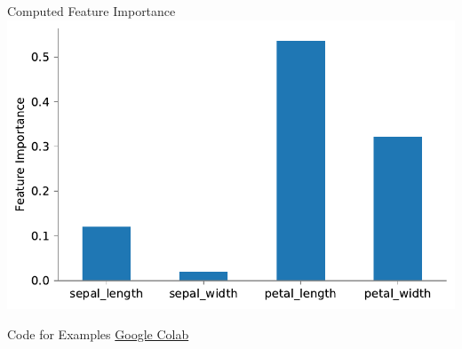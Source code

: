 \documentclass{beamer}
\begin{document}
\begin{frame}{Computed Feature Importance}
\includegraphics[scale=0.6]{feature-importance.pdf}
\end{frame}


	\begin{frame}{Code for Examples}
		\centering
		\href{https://colab.research.google.com/drive/1Yix-Hn1zqT6o-wOQkoiBhjKklzhJgekF}{Google Colab}
	\end{frame}
\end{document}
